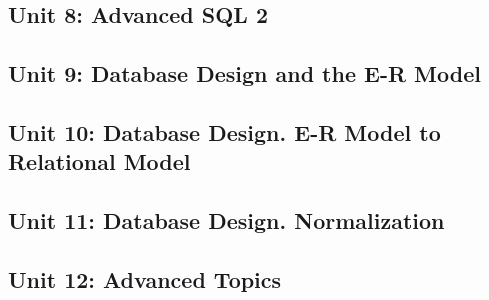 \subsection{Unit 8: Advanced SQL 2}








\subsection{Unit 9: Database Design and the E-R Model}

%





\subsection{Unit 10: Database Design. E-R Model to Relational Model}

%




\subsection{Unit 11: Database Design. Normalization}


%





\subsection{Unit 12: Advanced Topics}




